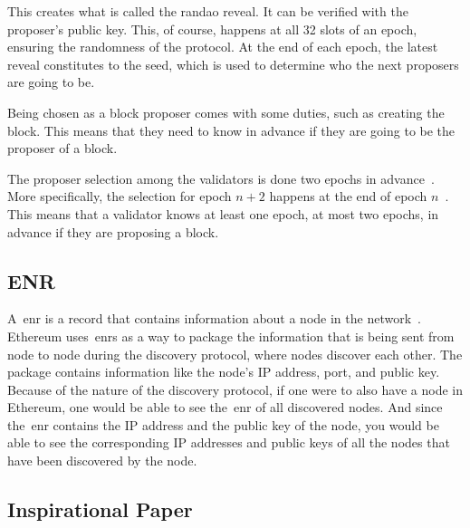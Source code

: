 This creates what is called the \gls{randao} reveal.
It can be verified with the proposer's public key.
This, of course, happens at all 32 slots of an epoch, ensuring the randomness of the protocol.
At the end of each epoch, the latest reveal constitutes to the seed, which is used to determine who the next proposers are going to be.


Being chosen as a block proposer comes with some duties, such as creating the block.
This means that they need to know in advance if they are going to be the proposer of a block.

The proposer selection among the validators is done two epochs in advance~\cite{random-selection}.
More specifically, the selection for epoch $n+2$ happens at the end of epoch $n$~\cite{upgrading-ethereum-randomness}.
This means that a validator knows at least one epoch, at most two epochs, in advance if they are proposing a block.


\subsection{ENR}\label{subsec:enr}
A~\gls{enr} is a record that contains information about a node in the network~\cite{EIP-778:Ethereum-Node-Records}.
Ethereum uses~\glspl{enr} as a way
to package the information that is being sent from node to node during the discovery protocol,
where nodes discover each other.
The package contains information like the node's IP address, port, and public key.
Because of the nature of the discovery protocol, if one were to also have a node in Ethereum,
one would be able to see the~\gls{enr} of all discovered nodes.
And since the~\gls{enr} contains the IP address and the public key of the node,
you would be able
to see the corresponding IP addresses and public keys of all the nodes that have been discovered by the node.


\subsection{Inspirational Paper}\label{subsec:inspirational-papers}

